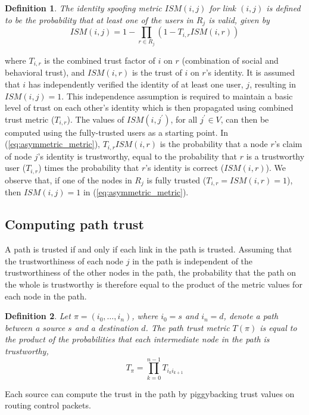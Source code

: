 \documentclass[conference]{IEEEtran}
\newtheorem{definition}{Definition}
\begin{document}
\begin{definition}
\label{def:asymmetric_metric}
The \emph{identity spoofing metric} $ISM(i,j)$ for link $(i,j)$ is defined to be the probability that
at least one of the users in $R_{j}$ is valid, given by
\begin{equation}
\label{eq:asymmetric_metric}
ISM(i,j) = 1 - \prod_{r \in R_{j}}{(1 - T_{i,r}ISM(i,r))}
\end{equation}
\end{definition}
where $T_{i,r}$ is the combined trust factor of $i$ on $r$ (combination of social and behavioral trust), and $ISM(i,r)$ is the trust of $i$ on $r$'s identity. It is assumed that $i$ has independently verified the identity of at least one user, $j$, resulting in $ISM(i,j) = 1$. This independence assumption is required to maintain a basic level of trust on each other's identity which is then propagated using combined trust metric ($T_{i,r}$). The values of $ISM(i,j^{\prime})$, for all $j^{\prime} \in V$, can then be computed using the fully-trusted users as a starting point.
 In (\ref{eq:asymmetric_metric}), $T_{i,r}ISM(i,r)$ is the probability that a node $r$'s claim of node $j$'s identity is trustworthy, equal to the probability that $r$ is a trustworthy user ($T_{i,r}$) times the probability that $r$'s identity is correct ($ISM(i,r)$). We observe that, if one of the nodes in $R_{j}$ is fully trusted ($T_{i,r} = ISM(i,r) = 1$), then $ISM(i,j)=1$ in (\ref{eq:asymmetric_metric}).


\subsection{Computing path trust}
\label{subsec:path_trust}
 A path is trusted if and only if each link in the path is trusted.  Assuming that the trustworthiness of each node $j$ in the path is independent of the trustworthiness of the other nodes in the path, the probability that the path on the whole is trustworthy is therefore equal to the product of the metric values for each node in the path.
\begin{definition}
\label{def:path_key_vulnerability}
Let $\pi = (i_{0}, \ldots, i_{n})$, where $i_{0} = s$ and $i_{n} = d$, denote a path between a source $s$ and a destination $d$.  The  path trust metric $T(\pi)$
is  equal to the product of the probabilities that each intermediate node in the path is trustworthy,
\begin{equation}
\label{eq:path_trust}
T_{\pi} = \prod_{k=0}^{n-1}{T_{i_{k}i_{k+1}}}
\end{equation}

\end{definition}
Each source can compute the trust in the path by piggybacking trust values on routing control packets.
\end{document}
